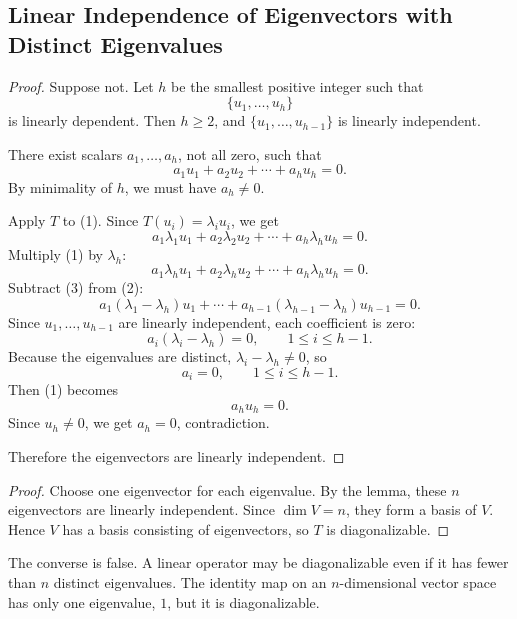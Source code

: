 \documentclass[11pt,openany]{article}
\begin{document}
\subsection{Linear Independence of Eigenvectors with Distinct Eigenvalues}
\begin{proof}
	Suppose not.  Let $h$ be the smallest positive integer such that
	\[
	\{u_1,\dots,u_h\}
	\]
	is linearly dependent.  Then $h\geq 2$, and $\{u_1,\dots,u_{h-1}\}$ is linearly independent.
	
	There exist scalars $a_1,\dots,a_h$, not all zero, such that
	\[
	a_1u_1+a_2u_2+\cdots+a_hu_h=0. \tag{1}
	\]
	By minimality of $h$, we must have $a_h\neq 0$.
	
	Apply $T$ to (1).  Since $T(u_i)=\lambda_i u_i$, we get
	\[
	a_1\lambda_1u_1+a_2\lambda_2u_2+\cdots+a_h\lambda_hu_h=0. \tag{2}
	\]
	Multiply (1) by $\lambda_h$:
	\[
	a_1\lambda_hu_1+a_2\lambda_hu_2+\cdots+a_h\lambda_hu_h=0. \tag{3}
	\]
	Subtract (3) from (2):
	\[
	a_1(\lambda_1-\lambda_h)u_1+\cdots+a_{h-1}(\lambda_{h-1}-\lambda_h)u_{h-1}=0.
	\]
	Since $u_1,\dots,u_{h-1}$ are linearly independent, each coefficient is zero:
	\[
	a_i(\lambda_i-\lambda_h)=0,
	\qquad 1\leq i\leq h-1.
	\]
	Because the eigenvalues are distinct, $\lambda_i-\lambda_h\neq 0$, so
	\[
	a_i=0,
	\qquad 1\leq i\leq h-1.
	\]
	Then (1) becomes
	\[
	a_hu_h=0.
	\]
	Since $u_h\neq 0$, we get $a_h=0$, contradiction.
	
	Therefore the eigenvectors are linearly independent.
\end{proof}

\begin{proof}
	Choose one eigenvector for each eigenvalue.  By the lemma, these $n$ eigenvectors are linearly independent.  Since $\dim V=n$, they form a basis of $V$.  Hence $V$ has a basis consisting of eigenvectors, so $T$ is diagonalizable.
\end{proof}

\begin{remark}
	The converse is false.  A linear operator may be diagonalizable even if it has fewer than $n$ distinct eigenvalues.  The identity map on an $n$-dimensional vector space has only one eigenvalue, $1$, but it is diagonalizable.
\end{remark}
\end{document}
